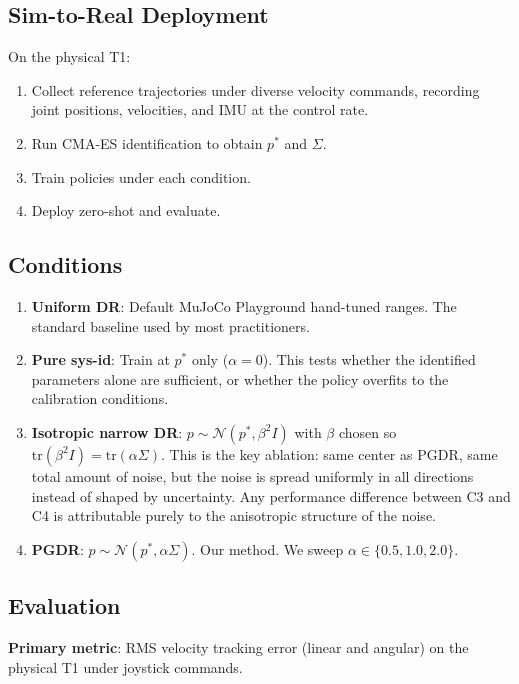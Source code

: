 \documentclass[10pt,twocolumn]{article}
\begin{document}
\subsection{Sim-to-Real Deployment}

On the physical T1:
\begin{enumerate}
    \item Collect reference trajectories under diverse velocity commands, recording joint positions, velocities, and IMU at the control rate.
    \item Run CMA-ES identification to obtain $p^*$ and $\Sigma$.
    \item Train policies under each condition.
    \item Deploy zero-shot and evaluate.
\end{enumerate}

\subsection{Conditions}

\begin{enumerate}
    \item[\textbf{C1.}] \textbf{Uniform DR}: Default MuJoCo Playground hand-tuned ranges.  The standard baseline used by most practitioners.
    \item[\textbf{C2.}] \textbf{Pure sys-id}: Train at $p^*$ only ($\alpha = 0$).  This tests whether the identified parameters alone are sufficient, or whether the policy overfits to the calibration conditions.
    \item[\textbf{C3.}] \textbf{Isotropic narrow DR}: $p \sim \mathcal{N}(p^*, \beta^2 I)$ with $\beta$ chosen so $\mathrm{tr}(\beta^2 I) = \mathrm{tr}(\alpha \Sigma)$.  This is the key ablation: same center as PGDR, same total amount of noise, but the noise is spread uniformly in all directions instead of shaped by uncertainty.  Any performance difference between C3 and C4 is attributable purely to the anisotropic structure of the noise.
    \item[\textbf{C4.}] \textbf{PGDR}: $p \sim \mathcal{N}(p^*, \alpha\Sigma)$.  Our method.  We sweep $\alpha \in \{0.5, 1.0, 2.0\}$.
\end{enumerate}

\subsection{Evaluation}

\textbf{Primary metric}: RMS velocity tracking error (linear and angular) on the physical T1 under joystick commands.
\end{document}
